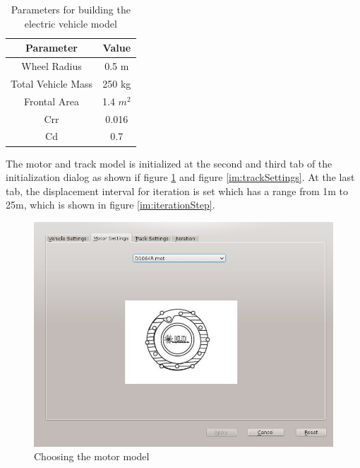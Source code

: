 \begin{table}[htbp]
\begin{center}
\begin{tabular}{|c|c|}
\hline
\textbf{Parameter} & \textbf{Value} \\ \hline
Wheel Radius & 0.5 m \\ \hline
Total Vehicle Mass & 250 kg \\ \hline
Frontal Area & 1.4 $m^2$ \\ \hline
Crr & 0.016 \\ \hline
Cd & 0.7 \\ \hline
\end{tabular}
\end{center}
\caption{Parameters for building the electric vehicle model}
\label{tb:vehicleModelParameter}
\end{table}

The motor and track model is initialized at the second and third tab of the initialization dialog as shown if figure \ref{im:motorSettings} and figure \ref{im:trackSettings}. At the last tab, the displacement interval for iteration is set which has a range from 1m to 25m, which is shown in figure \ref{im:iterationStep}.

\begin{figure}[htb]
	\centering
	\includegraphics[width=5in]{images/motor_settings.jpg}
	\caption{Choosing the motor model}
	\label{im:motorSettings}
\end{figure}

